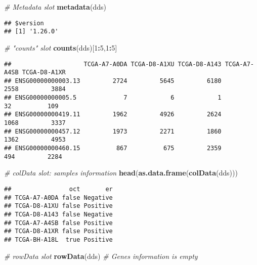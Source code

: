 \documentclass[]{book}
\newenvironment{Shaded}{\begin{snugshade}}{\end{snugshade}}
\newcommand{\KeywordTok}[1]{\textcolor[rgb]{0.13,0.29,0.53}{\textbf{#1}}}
\newcommand{\DecValTok}[1]{\textcolor[rgb]{0.00,0.00,0.81}{#1}}
\newcommand{\CommentTok}[1]{\textcolor[rgb]{0.56,0.35,0.01}{\textit{#1}}}
\newcommand{\OperatorTok}[1]{\textcolor[rgb]{0.81,0.36,0.00}{\textbf{#1}}}
\newcommand{\NormalTok}[1]{#1}
\begin{document}
\begin{Shaded}
\begin{Highlighting}[]
\CommentTok{# Metadata slot}
\KeywordTok{metadata}\NormalTok{(dds)}
\end{Highlighting}
\end{Shaded}

\begin{verbatim}
## $version
## [1] '1.26.0'
\end{verbatim}

\begin{Shaded}
\begin{Highlighting}[]
\CommentTok{# "counts" slot}
\KeywordTok{counts}\NormalTok{(dds)[}\DecValTok{1}\OperatorTok{:}\DecValTok{5}\NormalTok{,}\DecValTok{1}\OperatorTok{:}\DecValTok{5}\NormalTok{]}
\end{Highlighting}
\end{Shaded}

\begin{verbatim}
##                    TCGA-A7-A0DA TCGA-D8-A1XU TCGA-D8-A143 TCGA-A7-A4SB TCGA-D8-A1XR
## ENSG00000000003.13         2724         5645         6180         2558         3884
## ENSG00000000005.5             7            6            1           32          109
## ENSG00000000419.11         1962         4926         2624         1068         3337
## ENSG00000000457.12         1973         2271         1860         1362         4953
## ENSG00000000460.15          867          675         2359          494         2284
\end{verbatim}

\begin{Shaded}
\begin{Highlighting}[]
\CommentTok{# colData slot: samples information}
\KeywordTok{head}\NormalTok{(}\KeywordTok{as.data.frame}\NormalTok{(}\KeywordTok{colData}\NormalTok{(dds)))}
\end{Highlighting}
\end{Shaded}

\begin{verbatim}
##                oct       er
## TCGA-A7-A0DA false Negative
## TCGA-D8-A1XU false Positive
## TCGA-D8-A143 false Negative
## TCGA-A7-A4SB false Positive
## TCGA-D8-A1XR false Positive
## TCGA-BH-A18L  true Positive
\end{verbatim}

\begin{Shaded}
\begin{Highlighting}[]
\CommentTok{# rowData slot}
\KeywordTok{rowData}\NormalTok{(dds) }\CommentTok{# Genes information is empty}
\end{Highlighting}
\end{Shaded}
\end{document}

